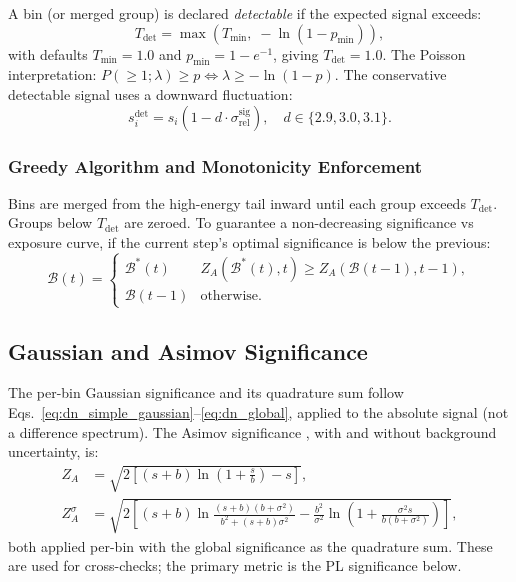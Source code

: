 \documentclass[12pt,a4paper]{article}
\newcommand{\srel}{\sigma_{\mathrm{rel}}}
\begin{document}
A bin (or merged group) is declared \emph{detectable} if the expected
signal exceeds:
\begin{equation}
  T_{\mathrm{det}} = \max\!\left(T_{\mathrm{min}},\;-\ln(1-p_{\mathrm{min}})\right),
  \label{eq:detection_threshold}
\end{equation}
with defaults $T_{\mathrm{min}}=1.0$ and $p_{\mathrm{min}}=1-e^{-1}$,
giving $T_{\mathrm{det}}=1.0$.  The Poisson interpretation:
$P(\ge 1;\lambda)\ge p \Leftrightarrow \lambda \ge -\ln(1-p)$.
The conservative detectable signal uses a downward fluctuation:
\begin{equation}
  s_i^{\mathrm{det}} = s_i(1 - d\cdot\srel^{\mathrm{sig}}),
  \quad d \in \{2.9,3.0,3.1\}.
  \label{eq:detectable_signal}
\end{equation}

\subsubsection{Greedy Algorithm and Monotonicity Enforcement}

Bins are merged from the high-energy tail inward until each group exceeds
$T_{\mathrm{det}}$.  Groups below $T_{\mathrm{det}}$ are zeroed.
To guarantee a non-decreasing significance vs exposure curve,
if the current step's optimal significance is below the previous:
\begin{equation}
  \mathcal{B}(t) =
  \begin{cases}
    \mathcal{B}^*(t) & Z_A(\mathcal{B}^*(t),t) \ge Z_A(\mathcal{B}(t-1),t-1),\\
    \mathcal{B}(t-1) & \text{otherwise.}
  \end{cases}
  \label{eq:monotone_rebin}
\end{equation}

\subsection{Gaussian and Asimov Significance}
\label{sec:hep_gaussian_asimov}

The per-bin Gaussian significance and its quadrature sum follow
Eqs.~\eqref{eq:dn_simple_gaussian}--\eqref{eq:dn_global}, applied to the
absolute signal (not a difference spectrum).
The Asimov significance \cite{Cowan2010}, with and without background uncertainty, is:
\begin{align}
  Z_A &= \sqrt{2\left[(s+b)\ln\!\left(1+\tfrac{s}{b}\right) - s\right]},
  \label{eq:asimov_simple}\\
  Z_A^{\sigma} &= \sqrt{2\left[
    (s+b)\ln\!\frac{(s+b)(b+\sigma^2)}{b^2+(s+b)\sigma^2}
    -\frac{b^2}{\sigma^2}\ln\!\left(1+\frac{\sigma^2 s}{b(b+\sigma^2)}\right)
  \right]},
  \label{eq:asimov_full}
\end{align}
both applied per-bin with the global significance as the quadrature sum.
These are used for cross-checks; the primary metric is the PL significance below.
\end{document}
